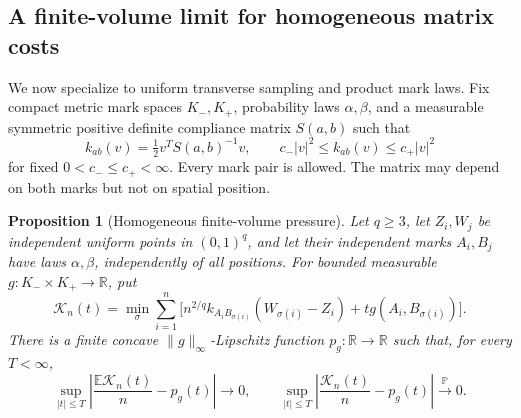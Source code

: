 \documentclass[11pt,reqno]{amsart}
\newtheorem{proposition}[theorem]{Proposition}
\theoremstyle{definition}
\theoremstyle{remark}
\numberwithin{equation}{section}
\newcommand{\R}{\mathbb R}
\newcommand{\E}{\mathbb E}
\newcommand{\Pp}{\mathbb P}
\begin{document}
\subsection{A finite-volume limit for homogeneous matrix costs}
\label{subsec:highd-finite-pressure}

We now specialize to uniform transverse sampling and product mark
laws. Fix compact metric mark spaces \(K_-,K_+\), probability laws
\(\alpha,\beta\), and a measurable symmetric positive definite compliance
matrix \(S(a,b)\) such that
\[
k_{ab}(v)=\tfrac12v^TS(a,b)^{-1}v,
\qquad c_-|v|^2\le k_{ab}(v)\le c_+|v|^2
\]
for fixed \(0<c_-\le c_+<\infty\). Every mark pair is allowed.
The matrix may depend on both marks but not on spatial position.

\begin{proposition}[Homogeneous finite-volume pressure]
\label{prop:highd-finite-pressure}
Let \(q\ge3\), let \(Z_i,W_j\) be independent uniform points
in \((0,1)^q\), and let their independent marks \(A_i,B_j\)
have laws \(\alpha,\beta\), independently of all positions.
For bounded measurable \(g:K_-\times K_+\to\R\), put
\[
\mathcal K_n(t)=\min_\sigma\sum_{i=1}^n
 \bigl[n^{2/q}k_{A_iB_{\sigma(i)}}(W_{\sigma(i)}-Z_i)
       +t g(A_i,B_{\sigma(i)})\bigr].
\]
There is a finite concave \(\|g\|_\infty\)-Lipschitz function
\(p_g:\R\to\R\) such that, for every \(T<\infty\),
\[
\sup_{|t|\le T}\left|\frac{\E\mathcal K_n(t)}n-p_g(t)\right|
 \longrightarrow0,
\qquad
\sup_{|t|\le T}\left|\frac{\mathcal K_n(t)}n-p_g(t)\right|
 \xrightarrow{\Pp}0.
\]
\end{proposition}
\end{document}
